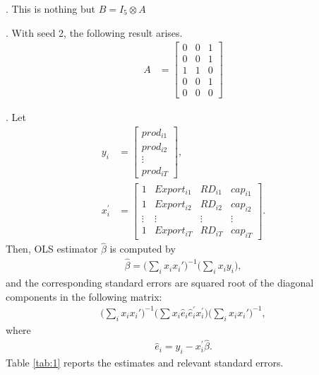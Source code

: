\documentclass[10pt, letterpaper]{article}
\begin{document}
. This is nothing but $B = I_{5} \otimes A$

. With seed 2, the following result arises. 
\begin{align}
A & = \begin{bmatrix}
          0 & 0 & 1 \\
          0 & 0 & 1 \\
          1 & 1 & 0 \\
          0 & 0 & 1 \\
          0 & 0 & 0 
       \end{bmatrix} \nonumber
\end{align} 

. Let
\begin{align}
y_{i}& = \begin{bmatrix}
           prod_{i1} \\
           prod_{i2} \\
           \vdots    \\
           prod_{iT}
         \end{bmatrix}, \nonumber \\          
x_{i}^{'}& = \begin{bmatrix}
           1 & Export_{i1} & RD_{i1} & cap_{i1} \\
           1 & Export_{i2} & RD_{i2} & cap_{i2} \\
           \vdots &  \vdots & \vdots & \vdots   \\
           1 & Export_{iT} & RD_{iT} & cap_{iT}
          \end{bmatrix}. \nonumber 
\end{align}
Then, OLS estimator $\hat{\beta}$ is computed by 
\begin{align}
\hat{\beta} = \big( \sum_{i} x_{i} x_{i}' \big)^{-1} \big( \sum_{i} x_{i} y_{i} \big), \nonumber
\end{align}
and the corresponding standard errors are squared root of the diagonal components in the following matrix:
\begin{align}
\big( \sum_{i} x_{i} x_{i}' \big)^{-1} \big( \sum x_{i}\hat{e}_{i}\hat{e}_{i}^{'}x_{i}^{'} \big) \big( \sum_{i} x_{i} x_{i}' \big)^{-1}, \nonumber
\end{align}
where
\begin{align}
\hat{e}_{i} = y_{i} - x_{i}^{'}\hat{\beta}. \nonumber
\end{align}
Table \ref{tab:1} reports the estimates and relevant standard errors.
\end{document}
